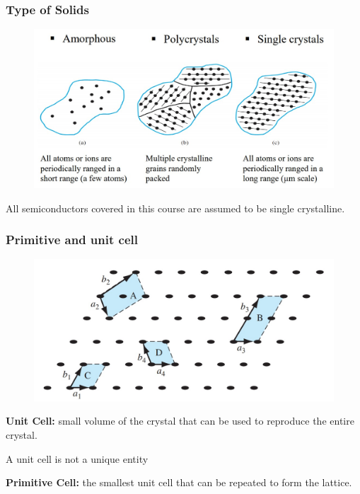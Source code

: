 \documentclass{beamer}
\begin{document}
    \begin{frame} \frametitle{Type of Solids}
        \begin{figure}[H]
            \centering
            \includegraphics[width=0.95\linewidth]{Type_of_solids.jpg}
            \label{fig:Type_of_solids.jpg}
        \end{figure}
        \par All semiconductors covered in this course are assumed to be single crystalline.
    \end{frame}

    \begin{frame} \frametitle{Primitive and unit cell}
        \begin{figure}[H]
            \centering
            \includegraphics[width=0.6\linewidth]{Unit-cell.jpg}
            \label{fig:Unit-cell.jpg}
        \end{figure}
        \par \textbf{Unit Cell: } small volume of the crystal that can be used to reproduce the entire crystal. 
        \par A unit cell is not a unique entity
        \par \textbf{Primitive Cell: }  the smallest unit cell that can be repeated to form the lattice.
        
    \end{frame}
\end{document}
